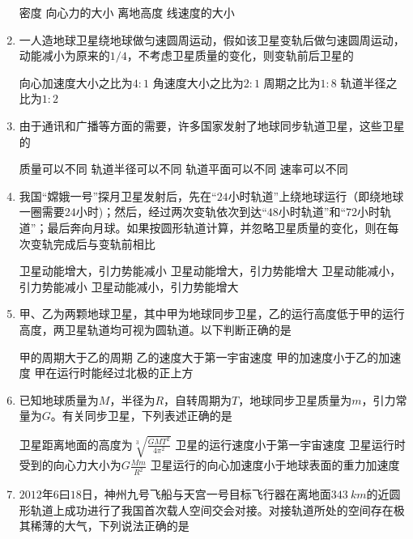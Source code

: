 \begin{enumerate}[leftmargin=0em]
\fourchoices
{密度}
{向心力的大小}
{离地高度}
{线速度的大小}



\item 
{}
一人造地球卫星绕地球做匀速圆周运动，假如该卫星变轨后做匀速圆周运动，动能减小为原来的$ 1/4 $，不考虑卫星质量的变化，则变轨前后卫星的  

\fourchoices
{向心加速度大小之比为$ 4:1 $ }
{角速度大小之比为$ 2:1 $}
{周期之比为$ 1:8 $ }
{轨道半径之比为$ 1:2 $}


\item 
{}
由于通讯和广播等方面的需要，许多国家发射了地球同步轨道卫星，这些卫星的  

\fourchoices
{质量可以不同 }
{轨道半径可以不同}
{轨道平面可以不同 }
{速率可以不同}



\item 
{}
我国“嫦娥一号”探月卫星发射后，先在“$ 24 $小时轨道”上绕地球运行（即绕地球一圈需要$ 24 $小时)；然后，经过两次变轨依次到达“$ 48 $小时轨道”和“$ 72 $小时轨道”；最后奔向月球。如果按圆形轨道计算，并忽略卫星质量的变化，则在每次变轨完成后与变轨前相比  

\fourchoices
{卫星动能增大，引力势能减小}
{卫星动能增大，引力势能增大}
{卫星动能减小，引力势能减小}
{卫星动能减小，引力势能增大}



\item 
{}
甲、乙为两颗地球卫星，其中甲为地球同步卫星，乙的运行高度低于甲的运行高度，两卫星轨道均可视为圆轨道。以下判断正确的是  

\fourchoices
{甲的周期大于乙的周期 }
{乙的速度大于第一宇宙速度}
{甲的加速度小于乙的加速度 }
{甲在运行时能经过北极的正上方}



\item 
{}
已知地球质量为$ M $，半径为$ R $，自转周期为$ T $，地球同步卫星质量为$ m $，引力常量为$ G $。有关同步卫星，下列表述正确的是  

\fourchoices
{卫星距离地面的高度为$\sqrt [ 3 ] { \frac { G M T ^ { 2 } } { 4 \pi ^ { 2 } } }$}
{卫星的运行速度小于第一宇宙速度}
{卫星运行时受到的向心力大小为$G \frac { M m } { R ^ { 2 } }$}
{卫星运行的向心加速度小于地球表面的重力加速度}


\item 
{}
$ 2012 $年$ 6 $曰$ 18 $日，神州九号飞船与天宫一号目标飞行器在离地面$ 343 \ km $的近圆形轨道上成功进行了我国首次载人空间交会对接。对接轨道所处的空间存在极其稀薄的大气，下列说法正确的是  


\end{enumerate}
